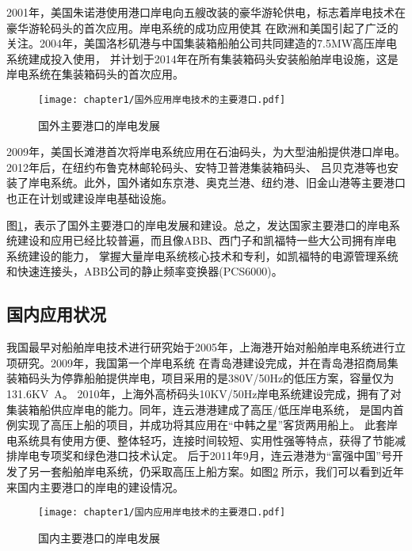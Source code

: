 2001年，美国朱诺港使用港口岸电向五艘改装的豪华游轮供电，标志着岸电技术在豪华游轮码头的首次应用。岸电系统的成功应用使其
在欧洲和美国引起了广泛的关注。2004年，美国洛杉矶港与中国集装箱船舶公司共同建造的7.5\si{MW}高压岸电系统建成投入使用\cite{SP5}，
并计划于2014年在所有集装箱码头安装船舶岸电设施，这是岸电系统在集装箱码头的首次应用。

\begin{figure}[!htp]
	\centering
	\texttt{[image: chapter1/国外应用岸电技术的主要港口.pdf]}
	\caption{国外主要港口的岸电发展}
	\label{fig:国外主要港口的岸电发展}
\end{figure}

2009年，美国长滩港首次将岸电系统应用在石油码头，为大型油船提供港口岸电。2012年后，在纽约布鲁克林邮轮码头、安特卫普港集装箱码头、
吕贝克港等也安装了岸电系统。此外，国外诸如东京港、奥克兰港、纽约港、旧金山港等主要港口也正在计划或建设岸电基础设施\cite{SP6}。

图\ref{fig:国外主要港口的岸电发展}，表示了国外主要港口的岸电发展和建设。总之，发达国家主要港口的岸电系统建设和应用已经比较普遍，而且像ABB、西门子和凯福特一些大公司拥有岸电系统建设的能力，
掌握大量岸电系统核心技术和专利，如凯福特的电源管理系统和快速连接头，ABB公司的静止频率变换器(PCS6000)\cite{SP5}。

\subsection{国内应用状况}

我国最早对船舶岸电技术进行研究始于2005年，上海港开始对船舶岸电系统进行立项研究。2009年，我国第一个岸电系统
在青岛港建设完成，并在青岛港招商局集装箱码头为停靠船舶提供岸电，项目采用的是380V/50Hz的低压方案，容量仅为131.6\si{KV.A}。
2010年，上海外高桥码头10KV/50Hz岸电系统建设完成，拥有了对集装箱船供应岸电的能力。同年，连云港港建成了高压/低压岸电系统，
是国内首例实现了高压上船的项目，并成功将其应用在“中韩之星”客货两用船上\cite{SP4}。
此套岸电系统具有使用方便、整体轻巧，连接时间较短、实用性强等特点，获得了节能减排岸电专项奖和绿色港口技术认定\cite{SP8}。
后于2011年9月，连云港港为“富强中国”号开发了另一套船舶岸电系统，仍采取高压上船方案。如图\ref{fig:国内主要港口的岸电发展}
所示，我们可以看到近年来国内主要港口的岸电的建设情况。

\begin{figure}[!htp]
	\centering
	\texttt{[image: chapter1/国内应用岸电技术的主要港口.pdf]}
	\caption{国内主要港口的岸电发展}
	\label{fig:国内主要港口的岸电发展}
\end{figure}

